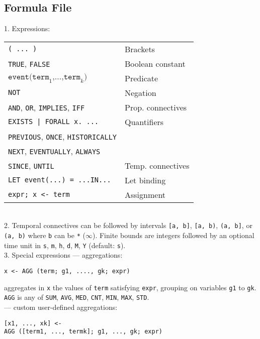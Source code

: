 \documentclass[a4paper,9pt]{extarticle}
\begin{document}
\begin{multicols}{2}
\section{Formula File}
\begin{tcolorbox}
  1. Expressions: \\
  \begin{tabular}{ll}
    \texttt{( ... )} & Brackets \\
    \texttt{TRUE}, \texttt{FALSE} & Boolean constant \\
    $\texttt{event}\texttt{(term}_1\texttt{,}\dots\texttt{,term}_k\texttt{)}$ & Predicate \\
    \texttt{NOT} & Negation \\
    \texttt{AND}, \texttt{OR}, \texttt{IMPLIES}, \texttt{IFF} & Prop. connectives \\
    \texttt{EXISTS | FORALL~x. ...} & Quantifiers \\
    \texttt{PREVIOUS}, \texttt{ONCE}, \texttt{HISTORICALLY} & \\
    \texttt{NEXT}, \texttt{EVENTUALLY}, \texttt{ALWAYS} & \\
    \texttt{SINCE}, \texttt{UNTIL} & Temp. connectives \\
    \texttt{LET event(...) = ...IN...} & Let binding \\
    \texttt{expr; x <- term} & Assignment
  \end{tabular}
  \\[5pt]

  2. Temporal connectives can be followed by intervals \texttt{[a, b]}, \texttt{[a, b)},
  \texttt{(a, b]}, or \texttt{(a, b)} where \texttt{b} can be \texttt{*} ($\infty$).
  Finite bounds are integers followed by an optional time unit in \texttt{s}, \texttt{m},
  \texttt{h}, \texttt{d}, \texttt{M}, \texttt{Y} (default: \texttt{s}).\\[5pt]
  3. Special expressions --- aggregations:
\begin{verbatim}
x <- AGG (term; g1, ...., gk; expr)
\end{verbatim}
  aggregates in \texttt{x} the values of \texttt{term} satisfying \texttt{expr}, grouping on
  variables \texttt{g1} to \texttt{gk}. \texttt{AGG} is any of \texttt{SUM}, \texttt{AVG},
  \texttt{MED}, \texttt{CNT}, \texttt{MIN}, \texttt{MAX}, \texttt{STD}.
\\[5pt]
  --- custom user-defined aggregations:
\begin{verbatim}
[x1, ..., xk] <-
AGG ([term1, ..., termk]; g1, ..., gk; expr)
\end{verbatim}


\end{tcolorbox}
\end{multicols}
\end{document}
